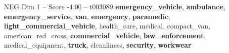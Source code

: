 \begin{textsample}{NEG Dim 1 – Score -4.00 – t003089}  \label{ex:f1_neg_021}
\textbf{emergency\_vehicle}, \textbf{ambulance}, \textbf{emergency\_service}, \textbf{van}, \textbf{emergency}, \textbf{paramedic}, \textbf{light\_commercial\_vehicle}, health\_care, medical, compact\_van, american\_red\_cross, \textbf{commercial\_vehicle}, \textbf{law\_enforcement}, medical\_equipment, \textbf{truck}, cleanliness, \textbf{security}, \textbf{workwear}

\end{textsample}
